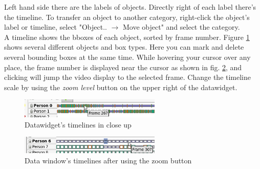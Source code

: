 Left hand side there are the labels of objects. Directly right of each label there's the timeline.  To transfer an object to another category, right-click the object's label or timeline, select "Object.. $\rightarrow$ Move object" and select the category.\\
A timeline shows the bboxes of each object, sorted by frame number. Figure \ref{fig:timeline} shows several different objects and box types. Here you can mark and delete several bounding boxes at the same time. While hovering your cursor over any place, the frame number is displayed near the cursor as shown in fig. \ref{fig:timeline_zoomed}, and clicking will jump the video display to the selected frame. Change the timeline scale by using the \emph{zoom level} button on the upper right of the datawidget.
   \begin{figure}[h]
      \centering
      \includegraphics[angle=0,width=0.6\textwidth]{images/timeline}
      \caption{Datawidget's timelines in close up}
      \label{fig:timeline}
   \end{figure}
\enlargethispage{1cm}
   \begin{figure}[h]
      \centering
      \includegraphics[angle=0,width=0.6\textwidth]{images/timeline_zoomed}
      \caption{Data window's timelines after using the zoom button}
      \label{fig:timeline_zoomed}
   \end{figure}
\newpage
